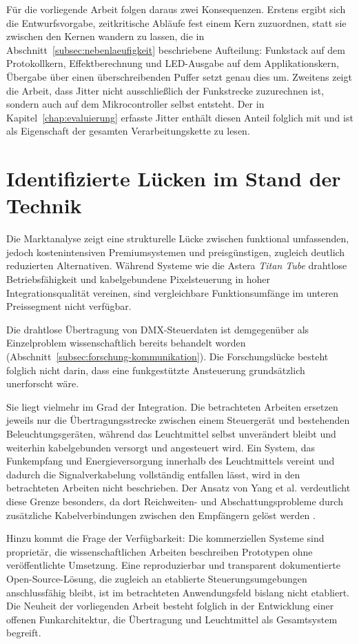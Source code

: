 Für die vorliegende Arbeit folgen daraus zwei Konsequenzen. Erstens ergibt sich die
Entwurfsvorgabe, zeitkritische Abläufe fest einem Kern zuzuordnen, statt sie zwischen
den Kernen wandern zu lassen, die in Abschnitt~\ref{subsec:nebenlaeufigkeit}
beschriebene Aufteilung: Funkstack auf dem Protokollkern, Effektberechnung und
LED-Ausgabe auf dem Applikationskern, Übergabe über einen überschreibenden Puffer
setzt genau dies um. Zweitens zeigt die Arbeit, dass Jitter nicht ausschließlich der
Funkstrecke zuzurechnen ist, sondern auch auf dem Mikrocontroller selbst entsteht. Der
in Kapitel~\ref{chap:evaluierung} erfasste Jitter enthält diesen Anteil folglich mit
und ist als Eigenschaft der gesamten Verarbeitungskette zu lesen.

\section{Identifizierte Lücken im Stand der Technik}
\label{sec:luecken-stand-der-technik}

Die Marktanalyse zeigt eine strukturelle Lücke zwischen funktional umfassenden, 
jedoch kostenintensiven Premiumsystemen und preisgünstigen, zugleich deutlich 
reduzierten Alternativen. Während Systeme wie die Astera \textit{Titan Tube} 
drahtlose Betriebsfähigkeit und kabelgebundene Pixelsteuerung in hoher Integrationsqualität 
vereinen, sind vergleichbare Funktionsumfänge im unteren Preissegment nicht verfügbar.

Die drahtlose Übertragung von DMX-Steuerdaten ist demgegenüber als Einzelproblem
wissenschaftlich bereits behandelt worden
(Abschnitt~\ref{subsec:forschung-kommunikation}). Die Forschungslücke besteht
folglich nicht darin, dass eine funkgestützte Ansteuerung grundsätzlich
unerforscht wäre.

Sie liegt vielmehr im Grad der Integration. Die betrachteten Arbeiten ersetzen
jeweils nur die Übertragungsstrecke zwischen einem Steuergerät und bestehenden
Beleuchtungsgeräten, während das Leuchtmittel selbst unverändert bleibt und
weiterhin kabelgebunden versorgt und angesteuert wird. Ein System, das
Funkempfang und Energieversorgung innerhalb des
Leuchtmittels vereint und dadurch die Signalverkabelung vollständig entfallen
lässt, wird in den betrachteten Arbeiten nicht beschrieben. Der Ansatz von Yang
et al. verdeutlicht diese Grenze besonders, da dort Reichweiten- und
Abschattungsprobleme durch zusätzliche Kabelverbindungen zwischen den Empfängern
gelöst werden \cite{yang2015real}.

Hinzu kommt die Frage der Verfügbarkeit: Die kommerziellen Systeme sind
proprietär, die wissenschaftlichen Arbeiten beschreiben Prototypen ohne
veröffentlichte Umsetzung. Eine reproduzierbar und transparent dokumentierte
Open-Source-Lösung, die zugleich an etablierte Steuerungsumgebungen
anschlussfähig bleibt, ist im betrachteten Anwendungsfeld bislang nicht
etabliert. Die Neuheit der vorliegenden Arbeit besteht folglich in der
Entwicklung einer offenen Funkarchitektur, die Übertragung und Leuchtmittel als
Gesamtsystem begreift.

